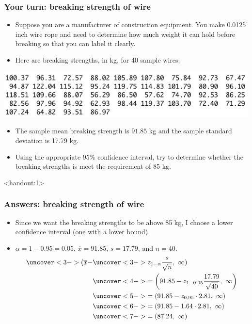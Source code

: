 \documentclass[handout]{beamer}\usepackage[]{graphicx}\usepackage[]{color}
\newcommand{\answers}{1}
\providecommand{\ov}[1]{\overline{#1}}
\numberwithin{equation}{section}
\begin{document}
\begin{frame}
\frametitle{Your turn: breaking strength of wire}
\begin{itemize}
\item Suppose you are a manufacturer of construction equipment. You make 0.0125 inch wire rope and need to determine how much weight it can hold before breaking so that you can label it clearly.
\pause \item Here are breaking strengths, in kg, for 40 sample wires:
\end{itemize}
 \includegraphics{../../fig/wiredata.png}
\begin{itemize}
\pause \item The sample mean breaking strength is $91.85$ kg and the sample standard deviation is 17.79 kg. 
\pause \item Using the appropriate 95\% confidence interval, try to determine whether the breaking strengths is meet the requirement of 85 kg.
\end{itemize}
\end{frame}

\begin{frame}<handout:\answers>
\frametitle{Answers: breaking strength of wire} \small
\begin{itemize}
\item Since we want the breaking strengths to be above 85 kg, I choose a lower confidence interval (one with a lower bound).
\pause \item $\alpha = 1 -0.95 = 0.05$, $\ov{x} = 91.85$, $s = 17.79$, and $n = 40$.
\begin{align*}
\uncover<3->{(\ov{x} -}&\uncover<3->{ z_{1 - \alpha} \frac{s}{\sqrt{n}}, \ \infty)} \\
&\uncover<4->{= \left (91.85 - z_{1 - 0.05} \frac{17.79}{\sqrt{40}}, \ \infty \right)} \\
&\uncover<5->{= (91.85 - z_{0.95} \cdot 2.81, \ \infty)} \\
&\uncover<6->{= (91.85 - 1.64 \cdot 2.81, \ \infty)} \\
&\uncover<7->{= (87.24, \ \infty)}
\end{align*}
\end{itemize}
\end{frame}
\end{document}
